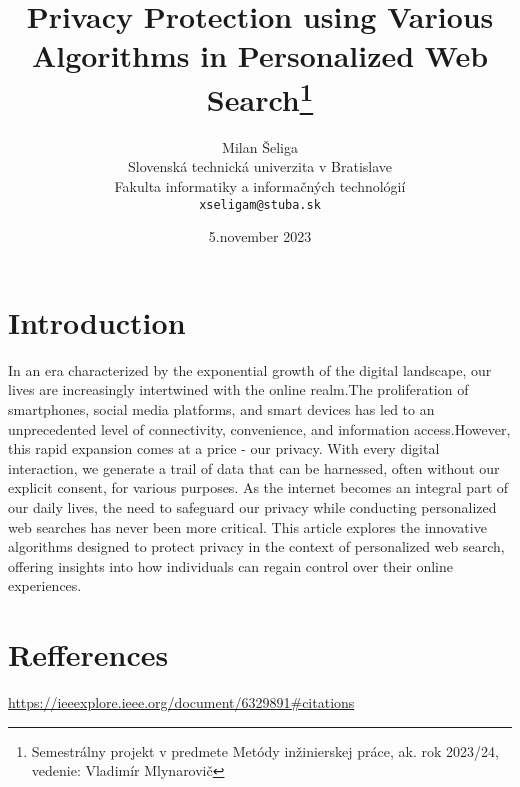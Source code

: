 \documentclass[10pt,twoside,slovak,a4paper]{article}
\title{Privacy Protection using Various Algorithms in Personalized Web Search\thanks{Semestrálny projekt v predmete Metódy inžinierskej práce, ak. rok 2023/24, vedenie: Vladimír Mlynarovič}} %
\author{Milan Šeliga\\[2pt]
	{\small Slovenská technická univerzita v Bratislave}\\
	{\small Fakulta informatiky a informačných technológií}\\
	{\small \texttt{xseligam@stuba.sk}}
	}
\date{\small 5.november 2023} %
\begin{document}
\maketitle

\section{Introduction}

In an era characterized by the exponential growth of the digital landscape, our lives are increasingly intertwined with the online realm.The proliferation of smartphones, social media platforms, and smart devices has led to an  unprecedented level of connectivity, convenience, and   information access.However, this rapid expansion comes at a price - our privacy. With every digital interaction, we generate a trail of data that can be harnessed, often without our explicit consent, for various purposes. As the internet becomes an integral part of our daily lives, the need to safeguard our privacy while  conducting personalized web searches has never been more critical. This article explores the innovative algorithms designed to protect privacy in the context of personalized web search, offering insights into how individuals can regain control over their online experiences. 	

\section{Refferences}


\url{https://ieeexplore.ieee.org/document/6329891#citations}
\vspace{12pt}




\end{document}
